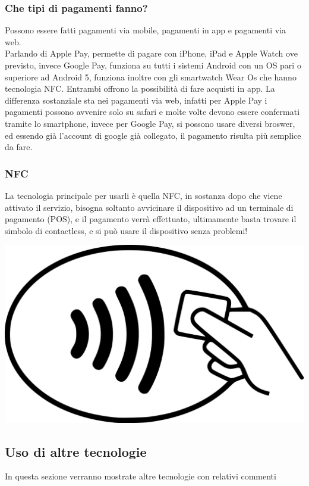 \subsubsection{Che tipi di pagamenti fanno?}
\hspace{\parindent}Possono essere fatti pagamenti via mobile, pagamenti in app e pagamenti via web.
\\Parlando di Apple Pay, permette di pagare con iPhone, iPad e Apple Watch ove previsto, invece Google Pay, funziona su tutti i sistemi Android con un OS pari o superiore ad Android 5, funziona inoltre con gli smartwatch Wear Os che hanno tecnologia NFC. Entrambi offrono la possibilità di fare acquisti in app. La differenza sostanziale sta nei pagamenti via web, infatti per Apple Pay i pagamenti possono avvenire solo su safari e molte volte devono essere confermati tramite lo smartphone, invece per Google Pay, si possono usare diversi broswer, ed essendo già l'account di google già collegato, il pagamento risulta più semplice da fare. 
\subsubsection{NFC}
\hspace{\parindent}La tecnologia principale per usarli è quella NFC, in sostanza dopo che viene attivato il servizio, bisogna soltanto avvicinare il dispositivo ad un terminale di pagamento (POS), e il pagamento verrà effettuato, ultimamente basta trovare il simbolo di contactless, e si può usare il dispositivo senza problemi!
\begin{center}
\includegraphics[scale=0.2]{./Images/cless}
\end{center}

\subsection{Uso di altre tecnologie}
\hspace{\parindent}In questa sezione verranno mostrate altre tecnologie con relativi commenti
